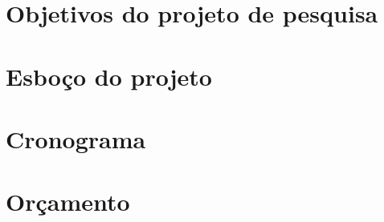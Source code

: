 \section{Objetivos do projeto de pesquisa}
\label{sec:obj}

\newpage

\section{Esboço do projeto}
\label{sec:proj}

\newpage

\section{Cronograma}
\label{sec:cronos}

\newpage

\section{Orçamento}
\label{sec:orc}
%
\newpage

\printbibliography



